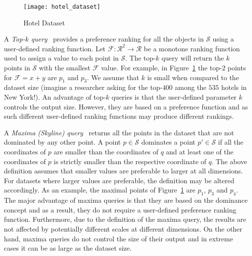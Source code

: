 \documentclass{llncs}
\begin{document}
\begin{figure}
\centering
\texttt{[image: hotel\_dataset]}
\vspace{-0.4cm}
\caption{Hotel Dataset} \label{fig:Hotels}
\vspace{-0.6cm}
\end{figure}

A \emph{Top-$k$ query}~\cite{FaginLN01} provides a preference ranking for all the objects in $\mathcal{S}$ using a user-defined ranking function. Let $\mathcal{F}:\mathcal{R}^2\rightarrow\mathcal{R}$ be a monotone ranking function used to assign a value to each point in $\mathcal{S}$. The top-$k$ query will return the $k$ points in $\mathcal{S}$ with the smallest $\mathcal{F}$ value. For example, in Figure~\ref{fig:Hotels} the top-$2$ points for $\mathcal{F}=x+y$ are $p_1$ and $p_3$. We assume that $k$ is small when compared to the dataset size (imagine a researcher asking for the top-$400$ among the $535$ hotels in New York!). An advantage of top-$k$ queries is that the user-defined parameter $k$ controls the output size. However, they are based on a preference function and as such different user-defined ranking functions may produce different rankings.

A \emph{Maxima (Skyline) query}~\cite{BorzsonyiKS01} returns all the points in the dataset that are not dominated by any other point. A point $p\in\mathcal{S}$ dominates a point $p'\in\mathcal{S}$ if all the coordinates of $p$ are smaller than the coordinates of $q$ and at least one of the coordinates of $p$ is strictly smaller than the respective coordinate of $q$. The above definition assumes that smaller values are preferable to larger at all dimensions. For datasets where larger values are preferable, the definition may be altered accordingly. As an example, the maximal points of Figure~\ref{fig:Hotels} are $p_1$, $p_3$ and $p_4$. The major advantage of maxima queries is that they are based on the dominance concept and as a result, they do not require a user-defined preference ranking function. Furthermore, due to the definition of the maxima query, the results are not affected by potentially different scales at different dimensions. On the other hand, maxima queries do not control the size of their output and in extreme cases it can be as large as the dataset size.
\end{document}

